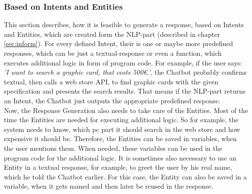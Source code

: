 \documentclass[10pt,final,journal,a4paper,oneside,twocolumn]{IEEEtran}
\begin{document}
\subsubsection{Based on Intents and Entities}\label{sec::ir}
This section describes, how it is feasible to generate a response, based on Intents and Entities, which are created form the NLP-part (described in chapter \ref{sec:inform}). For every defined Intent, their is one or maybe more predefined responses, which can be just a textual-response or even a function, which executes additional logic in form of program code. For example, if the user says: \textit{'I want to search a graphic card, that costs 500\euro.'}, the Chatbot probably confirms textual, then calls a web store API, to find graphic cards with the given specification and presents the search results. That means if the NLP-part returns an Intent, the Chatbot just outputs the appropriate predefined response.\\
Now, the Response Generation also needs to take care of the Entities. Most of the time the Entities are needed for executing additional logic. So for example, the system needs to know, which pc part it should search in the web store and how expensive it should be. Therefore, the Entities can be saved in variables, when the user mentions them. When needed, these variables can be used in the program code for the additional logic. It is sometimes also necessary to use an Entity in a textual response, for example, to greet the user by his real name, which he told the Chatbot earlier. For this case, the Entity can also be saved in a variable, when it gets named and then later be reused in the response.
\\
\end{document}
